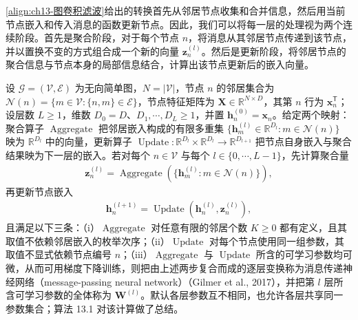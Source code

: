 \documentclass[../../main.tex]{subfiles}
\begin{document}
\eqref{align:ch13-图卷积滤波}给出的转换首先从邻居节点收集和合并信息，然后用当前节点嵌入和传入消息的函数更新节点。因此，我们可以将每一层的处理视为两个连续阶段。首先是聚合阶段，对于每个节点 $n$，将消息从其邻居节点传递到该节点，并以置换不变的方式组合成一个新的向量 $\bm{z}_n^{(l)}$。然后是更新阶段，将邻居节点的聚合信息与节点本身的局部信息结合，计算出该节点更新后的嵌入向量。

\begin{definition}[消息传递神经网络]\label{definition:ch13-消息传递神经网络}
设 $\mathcal{G}=(\mathcal{V},\mathcal{E})$ 为无向简单图，$N=|\mathcal{V}|$，节点 $n$ 的邻居集合为 $\mathcal{N}(n)=\{m\in\mathcal{V}:\{n,m\}\in\mathcal{E}\}$，节点特征矩阵为 $\bm{X}\in\mathbb{R}^{N\times D}$，其第 $n$ 行为 $\bm{x}_n^{\mathsf T}$；设层数 $L\geqslant1$，维数 $D_0=D$、$D_1,\cdots,D_L\geqslant1$，并置 $\bm{h}_n^{(0)}=\bm{x}_n$。给定两个映射：聚合算子 $\operatorname{Aggregate}$ 把邻居嵌入构成的有限多重集 $\{\bm{h}_m^{(l)}\in\mathbb{R}^{D_l}:m\in\mathcal{N}(n)\}$ 映为 $\mathbb{R}^{D_l}$ 中的向量，更新算子 $\operatorname{Update}:\mathbb{R}^{D_l}\times\mathbb{R}^{D_l}\to\mathbb{R}^{D_{l+1}}$ 把节点自身嵌入与聚合结果映为下一层的嵌入。若对每个 $n\in\mathcal{V}$ 与每个 $l\in\{0,\cdots,L-1\}$，先计算聚合量
\begin{align}
\bm{z}_n^{(l)}=\operatorname{Aggregate}\!\left(\{\bm{h}_m^{(l)}:m\in\mathcal{N}(n)\}\right),
\label{align:ch13-聚合定义}
\end{align}
再更新节点嵌入
\begin{align}
\bm{h}_n^{(l+1)}=\operatorname{Update}\!\left(\bm{h}_n^{(l)},\bm{z}_n^{(l)}\right),
\label{align:ch13-更新定义}
\end{align}
且满足以下三条：（i）$\operatorname{Aggregate}$ 对任意有限的邻居个数 $K\geqslant0$ 都有定义，且其取值不依赖邻居嵌入的枚举次序；（ii）$\operatorname{Update}$ 对每个节点使用同一组参数，其取值不显式依赖节点编号 $n$；（iii）$\operatorname{Aggregate}$ 与 $\operatorname{Update}$ 所含的可学习参数均可微，从而可用梯度下降训练，则把由上述两步复合而成的逐层变换称为消息传递神经网络（message-passing neural network）（Gilmer et al., 2017），并把第 $l$ 层所含可学习参数的全体称为 $\bm{W}^{(l)}$。默认各层参数互不相同，也允许各层共享同一参数集合；算法 13.1 对该计算做了总结。
\end{definition}
\end{document}

